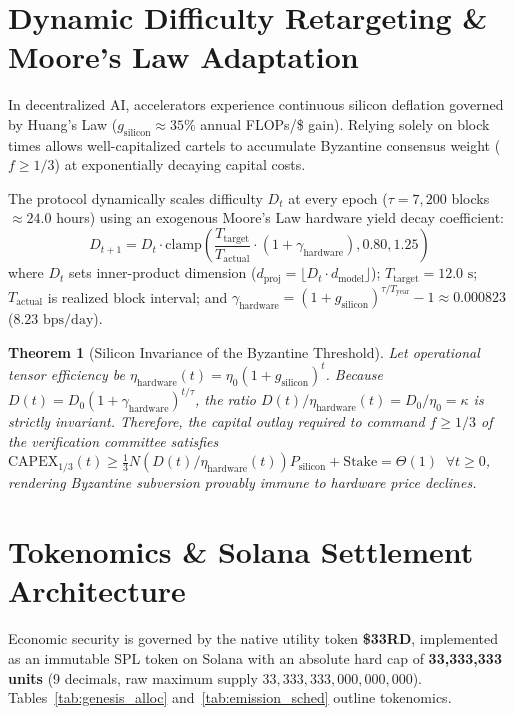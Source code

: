 \documentclass[10pt,twocolumn,letterpaper]{article}
\newtheorem{theorem}{Theorem}
\begin{document}
\section{Dynamic Difficulty Retargeting \& Moore's Law Adaptation}
In decentralized AI, accelerators experience continuous silicon deflation governed by Huang's Law ($g_{\text{silicon}} \approx 35\%$ annual FLOPs/\$ gain). Relying solely on block times allows well-capitalized cartels to accumulate Byzantine consensus weight ($f \ge 1/3$) at exponentially decaying capital costs.

The protocol dynamically scales difficulty $D_t$ at every epoch ($\tau = 7{,}200$ blocks $\approx 24.0$ hours) using an exogenous Moore's Law hardware yield decay coefficient:
\begin{equation}
D_{t+1} = D_t \cdot \text{clamp}\left(\frac{T_{\text{target}}}{T_{\text{actual}}} \cdot \left(1 + \gamma_{\text{hardware}}\right), 0.80, 1.25\right)
\end{equation}
where $D_t$ sets inner-product dimension ($d_{\text{proj}} = \lfloor D_t \cdot d_{\text{model}} \rfloor$); $T_{\text{target}} = 12.0\text{ s}$; $T_{\text{actual}}$ is realized block interval; and $\gamma_{\text{hardware}} = (1 + g_{\text{silicon}})^{\tau / T_{\text{year}}} - 1 \approx 0.000823$ ($8.23\text{ bps/day}$).

\begin{theorem}[Silicon Invariance of the Byzantine Threshold]
Let operational tensor efficiency be $\eta_{\text{hardware}}(t) = \eta_0 (1 + g_{\text{silicon}})^t$. Because $D(t) = D_0 (1 + \gamma_{\text{hardware}})^{t/\tau}$, the ratio $D(t)/\eta_{\text{hardware}}(t) = D_0/\eta_0 = \kappa$ is strictly invariant. Therefore, the capital outlay required to command $f \ge 1/3$ of the verification committee satisfies $\text{CAPEX}_{1/3}(t) \ge \frac{1}{3} N (D(t)/\eta_{\text{hardware}}(t)) P_{\text{silicon}} + \text{Stake} = \Theta(1) \;\; \forall t \ge 0$, rendering Byzantine subversion provably immune to hardware price declines.
\end{theorem}

\section{Tokenomics \& Solana Settlement Architecture}
Economic security is governed by the native utility token \textbf{\$33RD}, implemented as an immutable SPL token on Solana with an absolute hard cap of \textbf{33,333,333 units} (9 decimals, raw maximum supply $33{,}333{,}333{,}000{,}000{,}000$). Tables~\ref{tab:genesis_alloc} and~\ref{tab:emission_sched} outline tokenomics.
\end{document}
